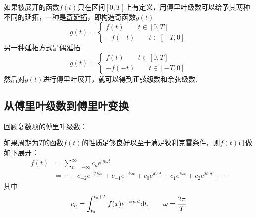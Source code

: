 \documentclass[main.tex]{subfiles}
\begin{document}
如果被展开的函数\(f(t)\)只在区间\([0,T]\)上有定义，用傅里叶级数可以给予其两种不同的延拓，一种是\uline{奇延拓}，即构造奇函数\(g(t)\)
\[g(t)=\begin{cases} f(t) \qquad t\in[0,T] \\ -f(-t) \qquad t \in [-T,0]\end{cases}\]
另一种延拓方式是\uline{偶延拓}
\[g(t)=\begin{cases} f(t) \qquad t\in[0,T] \\ -f(-t) \qquad t \in [-T,0]\end{cases}\]
然后对\(g(t)\)进行傅里叶展开，就可以得到正弦级数和余弦级数.


\subsection{从傅里叶级数到傅里叶变换}

回顾复数项的傅里叶级数：
\begin{reference}
    如果周期为\(T\)的函数\(f(t)\)的性质足够良好以至于满足狄利克雷条件，则\(f(t)\)可做如下展开：
    \begin{align*}
        f(t) &= \sum_{n=-\infty}^{\infty}c_ne^{in\omega t} \\
        &= \cdots + c_{-2}e^{-2i\omega t} + c_{-1}e^{-i\omega t} + c_{0}e^{i0\omega t} + c_{1}e^{i\omega t} + c_{2}e^{2i\omega t} + \cdots
    \end{align*}
    其中
    \[c_n=\int_{t_0}^{t_0+T}f(x)e^{-in\omega t}{\rm d}t, \qquad \omega=\frac{2\pi}{T}\]
\end{reference}
\end{document}
